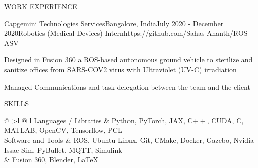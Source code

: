 \documentclass{resume} %
\begin{document}
\begin{rSection}{WORK EXPERIENCE}
	\begin{rProjExpDetails}{Capgemini Technologies Services}{Bangalore, India}{July 2020 - December 2020}{Robotics (Medical Devices) Intern}{https://github.com/Sahas-Ananth/ROS-ASV}{}
		\item Designed in Fusion 360 a ROS-based autonomous ground vehicle to sterilize and sanitize offices from SARS-COV2 virus with Ultraviolet (UV-C) irradiation
		\item Managed Communications and task delegation between the team and the client
	\end{rProjExpDetails}
\end{rSection}
\begin{rSection}{SKILLS}
	\begin{tabular}{ @ {} >{\bfseries}l @{\hspace{3ex}} l }
		Languages / Libraries & Python, PyTorch, JAX, C$++$, CUDA, C, MATLAB, OpenCV, Tensorflow, PCL                     \\
		Software and Tools    & ROS, Ubuntu Linux, Git, CMake, Docker, Gazebo, Nvidia Issac Sim, PyBullet, MQTT, Simulink \\
		                      & Fusion 360, Blender, LaTeX                                                                \\
	\end{tabular}
\end{rSection}
\vspace{-3.5mm}
\end{document}
